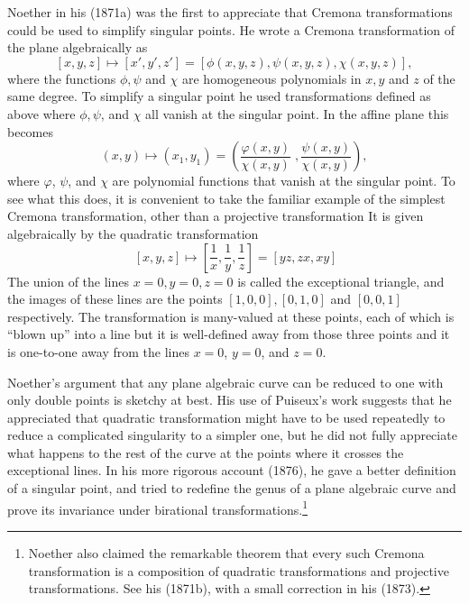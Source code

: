 Noether in his (1871a) was the first to appreciate that Cremona transformations could be used to simplify singular points.  He wrote a Cremona transformation of the plane algebraically as 
\[[x, y, z] \mapsto [x', y', z'] = [\phi (x, y, z), \psi (x, y, z),  \chi (x, y, z)], \]
where the functions $\phi, \psi$ and $\chi$ are homogeneous polynomials in $x, y$ and $z$ of the same degree. To simplify a singular point he used
transformations defined as above where $\phi, \psi$, and $\chi$ all vanish at the singular point.  In the affine plane this becomes
\[(x , y) \mapsto (x_1 , y_1) = \left(\frac{\varphi (x, y)}{\chi (x, y)}\;,  \frac{\psi (x, y)}{\chi (x, y)} \right),\]
where $\varphi$, $\psi$, and $\chi$ are polynomial functions that vanish at the singular point.  To see what this does, it is convenient to take the familiar example of 
the simplest  Cremona transformation, other than a projective transformation It  is given algebraically by  the quadratic transformation 
\begin{equation}~\label{eq:qt1}
[x, y, z] \mapsto \left[\frac{1}{x}, \frac{1}{y}, \frac{1}{z}\right] = [yz, zx, xy]\end{equation}
The union of the lines $x=0,y=0,z=0$ is called the exceptional triangle, and the images of these lines are the points $[1, 0, 0], [0, 1, 0]$ and $[0, 0, 1]$ respectively.
The transformation is many-valued at these points, each of which is ``blown up'' into a line  but it is well-defined away from those three points and it is  one-to-one away from  the lines $x=0$, $y=0$, and $z = 0.$ 


Noether's argument that any plane algebraic curve can be reduced to one with only double points is sketchy at best. His use of Puiseux's work suggests that he appreciated that quadratic transformation might have to be used repeatedly to reduce a complicated singularity to a simpler one, but he did not  fully appreciate what happens to the rest of the curve at the points where it crosses the exceptional lines. In his more rigorous account  (1876),  he gave a better definition of a singular point, and tried to redefine the genus of a plane algebraic curve and prove its  invariance  under birational  transformations.\footnote{Noether also claimed  the remarkable theorem that every such Cremona transformation is a composition of quadratic transformations and projective transformations. See his (1871b), with a small correction in his (1873).} 



